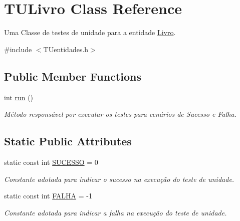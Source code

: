 \hypertarget{classTULivro}{}\section{T\+U\+Livro Class Reference}
\label{classTULivro}


Uma Classe de testes de unidade para a entidade \hyperlink{classLivro}{Livro}.  




{\ttfamily \#include $<$T\+Uentidades.\+h$>$}

\subsection*{Public Member Functions}
\begin{DoxyCompactItemize}
\item 
int \hyperlink{classTULivro_ab5966f07d89cd055f1cb35bdf0769169}{run} ()
\begin{DoxyCompactList}\small\item\em Método responsável por executar os testes para cenários de Sucesso e Falha. \end{DoxyCompactList}\end{DoxyCompactItemize}
\subsection*{Static Public Attributes}
\begin{DoxyCompactItemize}
\item 
\mbox{\label{classTULivro_a9f66d4598c6c74fea2b06b77e0e1e340}} 
static const int \hyperlink{classTULivro_a9f66d4598c6c74fea2b06b77e0e1e340}{S\+U\+C\+E\+S\+SO} = 0
\begin{DoxyCompactList}\small\item\em Constante adotada para indicar o sucesso na execução do teste de unidade. \end{DoxyCompactList}\item 
\mbox{\label{classTULivro_a15c83153ff3decb1066d41d50c7429c6}} 
static const int \hyperlink{classTULivro_a15c83153ff3decb1066d41d50c7429c6}{F\+A\+L\+HA} = -\/1
\begin{DoxyCompactList}\small\item\em Constante adotada para indicar a falha na execução do teste de unidade. \end{DoxyCompactList}\end{DoxyCompactItemize}


